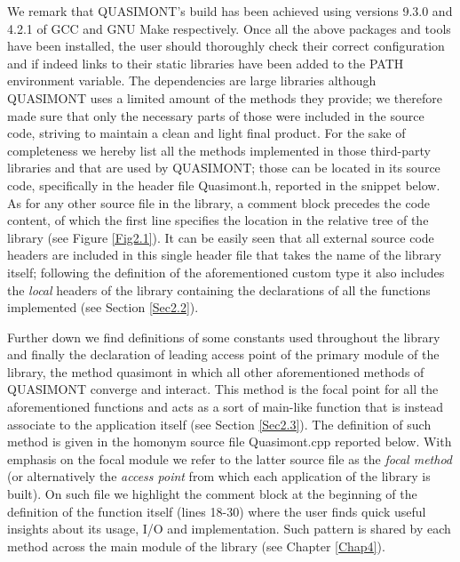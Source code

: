 \documentclass[a4paper, twosided]{book}
\begin{document}
\noindent
We remark that QUASIMONT's build has been achieved using versions \colorbox{poliGrayBlue}{9.3.0} and \colorbox{poliGrayBlue}{4.2.1} of GCC and GNU Make respectively. Once all the above packages and tools have been installed, the user should thoroughly check their correct configuration and if indeed links to their static libraries have been added to the \colorbox{poliGrayBlue}{PATH} environment variable. The dependencies are large libraries although QUASIMONT uses a limited amount of the methods they provide; we therefore made sure that only the necessary parts of those were included in the source code, striving to maintain a clean and light final product. For the sake of completeness we hereby list all the methods implemented in those third-party libraries and that are used by QUASIMONT; those can be located in its source code, specifically in the header file \colorbox{poliGrayBlue}{Quasimont.h}, reported in the snippet below. As for any other source file in the library, a comment block precedes the code content, of which the first line specifies the location in the relative tree of the library (see Figure \ref{Fig2.1}).
It can be easily seen that all external source code headers are included in this single header file that takes the name of the library itself; following the definition of the aforementioned custom type it also includes the \textsl{local} headers of the library containing the declarations of all the functions implemented (see Section \ref{Sec2.2}).

\newpage
\vspace{0.5cm}
\vspace{0.5cm}

\noindent
Further down we find definitions of some constants used throughout the library and finally the declaration of leading access point of the primary module of the library, the method \colorbox{poliGrayBlue}{quasimont} in which all other aforementioned methods of QUASIMONT converge and interact. This method is the focal point for all the aforementioned functions and acts as a sort of main-like function that is instead associate to the application itself (see Section \ref{Sec2.3}). The definition of such method is given in the homonym source file \colorbox{poliGrayBlue}{Quasimont.cpp} reported below. With emphasis on the focal module we refer to the latter source file as the {\itshape focal method} (or alternatively the {\itshape access point} from which each application of the library is built). On such file we highlight the comment block at the beginning of the definition of the function itself (lines \colorbox{poliGrayBlue}{18-30}) where the user finds quick useful insights about its usage, I/O and implementation. Such pattern is shared by each method across the main module of the library (see Chapter \ref{Chap4}).
\end{document}
